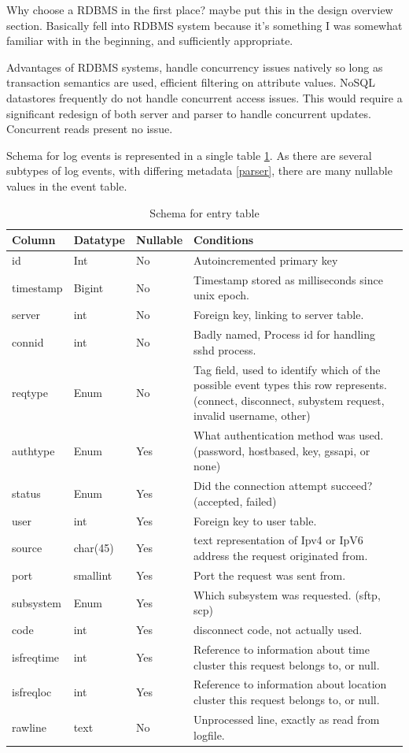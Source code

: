 Why choose a RDBMS in the first place? maybe put this in the design overview section. Basically fell into RDBMS system because it's something I was somewhat familiar with in the beginning, and sufficiently appropriate.

Advantages of RDBMS systems, handle concurrency issues natively so long as transaction semantics are used, efficient filtering on attribute values. NoSQL datastores frequently do not handle concurrent access issues. This would require a significant redesign of both server and parser to handle concurrent updates. Concurrent reads present no issue. 

Schema for log events is represented in a single table \ref{entry_schema}. As there are several subtypes of log events, with differing metadata \ref{parser}, there are many nullable values in the event table.
\begin{table}[tbh]
\centering
\begin{tabular}{l || l | l | p{}}
Column & Datatype & Nullable & Conditions \\ \hline
id & Int & No & Autoincremented primary key \\
timestamp & Bigint & No & Timestamp stored as milliseconds since unix epoch. \\
server & int & No & Foreign key, linking to server table. \\
connid & int & No & Badly named, Process id for handling sshd process. \\
reqtype & Enum & No & Tag field, used to identify which of the possible event types this row represents. (connect, disconnect, subystem request, invalid username, other) \\
authtype & Enum & Yes & What authentication method was used. (password, hostbased, key, gssapi, or none) \\
status & Enum & Yes & Did the connection attempt succeed? (accepted, failed) \\
user & int & Yes & Foreign key to user table. \\
source & char(45) & Yes & text representation of Ipv4 or IpV6 address the request originated from. \\
port & smallint & Yes & Port the request was sent from. \\
subsystem & Enum & Yes & Which subsystem was requested. (sftp, scp) \\
code & int & Yes & disconnect code, not actually used. \\
isfreqtime & int & Yes & Reference to information about time cluster this request belongs to, or null. \\
isfreqloc & int & Yes & Reference to information about location cluster this request belongs to, or null. \\
rawline & text & No & Unprocessed line, exactly as read from logfile. \\
\end {tabular}
\caption{Schema for entry table}
\label{entry_schema}
\end{table}

